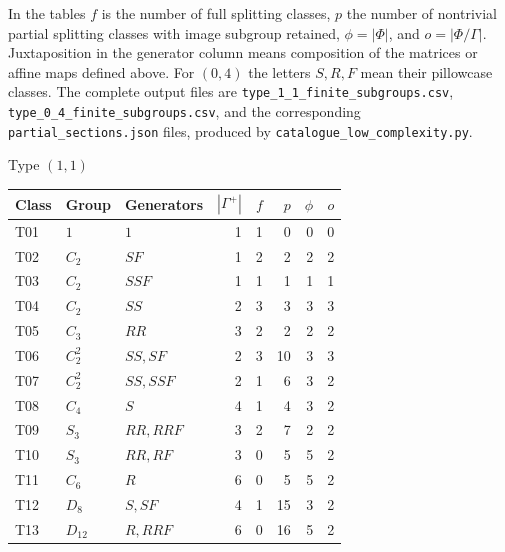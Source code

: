 In the tables $f$ is the number of full splitting classes, $p$ the number
of nontrivial partial splitting classes with image subgroup retained,
$\phi=|\Phi|$, and $o=|\Phi/\Gamma|$.  Juxtaposition in the generator
column means composition of the matrices or affine maps defined above.
For $(0,4)$ the letters $S,R,F$ mean their pillowcase classes.
The complete output files are
\texttt{type\_1\_1\_finite\_subgroups.csv},
\texttt{type\_0\_4\_finite\_subgroups.csv}, and the corresponding
\texttt{partial\_sections.json} files, produced by
\texttt{catalogue\_low\_complexity.py}.

\begin{center}Type $(1,1)$\end{center}
\begin{longtable}{lllrrrrr}
\toprule
Class & Group & Generators & $|\Gamma^+|$ & $f$ & $p$ & $\phi$ & $o$\\
\midrule\endhead
T01 & $1$ & $1$ & 1 & 1 & 0 & 0 & 0\\
T02 & $C_2$ & $SF$ & 1 & 2 & 2 & 2 & 2\\
T03 & $C_2$ & $SSF$ & 1 & 1 & 1 & 1 & 1\\
T04 & $C_2$ & $SS$ & 2 & 3 & 3 & 3 & 3\\
T05 & $C_3$ & $RR$ & 3 & 2 & 2 & 2 & 2\\
T06 & $C_2^2$ & $SS,SF$ & 2 & 3 & 10 & 3 & 3\\
T07 & $C_2^2$ & $SS,SSF$ & 2 & 1 & 6 & 3 & 2\\
T08 & $C_4$ & $S$ & 4 & 1 & 4 & 3 & 2\\
T09 & $S_3$ & $RR,RRF$ & 3 & 2 & 7 & 2 & 2\\
T10 & $S_3$ & $RR,RF$ & 3 & 0 & 5 & 5 & 2\\
T11 & $C_6$ & $R$ & 6 & 0 & 5 & 5 & 2\\
T12 & $D_8$ & $S,SF$ & 4 & 1 & 15 & 3 & 2\\
T13 & $D_{12}$ & $R,RRF$ & 6 & 0 & 16 & 5 & 2\\
\bottomrule
\end{longtable}

